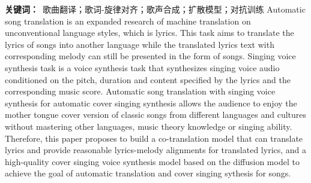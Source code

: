 \noindent\textbf{关键词：}~歌曲翻译；歌词-旋律对齐；歌声合成；扩散模型；对抗训练
Automatic song translation is an expanded research of machine translation on unconventional language styles, which is lyrics. This task aims to translate the lyrics of songs into another language while the translated lyrics text with corresponding melody can still be presented in the form of songs.
Singing voice synthesis task is a voice synthesis task that synthesizes singing voice audio conditioned on the pitch, duration and content specified by the lyrics and the corresponding music score. Automatic song translation with singing voice synthesis for automatic cover singing synthesis allows the audience to enjoy the mother tongue cover version of classic songs from different languages and cultures without mastering other languages, music theory knowledge or singing ability.
Therefore, this paper proposes to build a co-translation model that can translate lyrics and provide reasonable lyrics-melody alignments for translated lyrics, and a high-quality cover singing voice synthesis model based on the diffusion model to achieve the goal of automatic translation and cover singing sythesis for songs.

